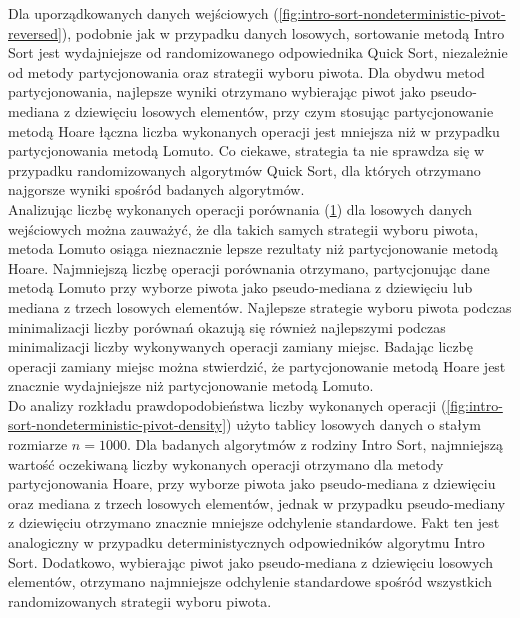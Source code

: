 Dla uporządkowanych danych wejściowych (\ref{fig:intro-sort-nondeterministic-pivot-reversed}), podobnie jak w przypadku danych losowych, sortowanie metodą Intro Sort jest wydajniejsze od randomizowanego odpowiednika Quick Sort, niezależnie od metody partycjonowania oraz strategii wyboru piwota. Dla obydwu metod partycjonowania, najlepsze wyniki otrzymano wybierając piwot jako pseudo-mediana z dziewięciu losowych elementów, przy czym stosując partycjonowanie metodą Hoare łączna liczba wykonanych operacji jest mniejsza niż w przypadku partycjonowania metodą Lomuto. Co ciekawe, strategia ta nie sprawdza się w przypadku randomizowanych algorytmów Quick Sort, dla których otrzymano najgorsze wyniki spośród badanych algorytmów.\\

Analizując liczbę wykonanych operacji porównania (\ref{fig:intro-sort-nondeterministic-pivot-random-all}) dla losowych danych wejściowych można zauważyć, że dla takich samych strategii wyboru piwota, metoda Lomuto osiąga nieznacznie lepsze rezultaty niż partycjonowanie metodą Hoare. Najmniejszą liczbę operacji porównania otrzymano, partycjonując dane metodą Lomuto przy wyborze piwota jako pseudo-mediana z dziewięciu lub mediana z trzech losowych elementów.
Najlepsze strategie wyboru piwota podczas minimalizacji liczby porównań okazują się również najlepszymi podczas minimalizacji liczby wykonywanych operacji zamiany miejsc. Badając liczbę operacji zamiany miejsc można stwierdzić, że partycjonowanie metodą Hoare jest znacznie wydajniejsze niż partycjonowanie metodą Lomuto.\\

Do analizy rozkładu prawdopodobieństwa liczby wykonanych operacji (\ref{fig:intro-sort-nondeterministic-pivot-density}) użyto tablicy losowych danych o stałym rozmiarze $n = 1000$. Dla badanych algorytmów z rodziny Intro Sort, najmniejszą wartość oczekiwaną liczby wykonanych operacji otrzymano dla metody partycjonowania Hoare, przy wyborze piwota jako pseudo-mediana z dziewięciu oraz mediana z trzech losowych elementów, jednak w przypadku pseudo-mediany z dziewięciu otrzymano znacznie mniejsze odchylenie standardowe. Fakt ten jest analogiczny w przypadku deterministycznych odpowiedników algorytmu Intro Sort. Dodatkowo, wybierając piwot jako pseudo-mediana z dziewięciu losowych elementów, otrzymano najmniejsze odchylenie standardowe spośród wszystkich randomizowanych strategii wyboru piwota.\\

\begin{figure}[]
	\centering
	
	\caption[]{}
	\label{fig:intro-sort-nondeterministic-pivot-random-all}
\end{figure}

